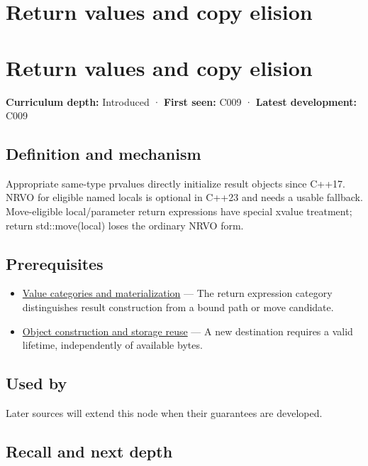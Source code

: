 \hypertarget{appendix-b08d3788c5c6}{}
\section*{Return values and copy elision}
\section{Return values and copy elision}\label{appendix-b08d3788c5c6-return-values-and-copy-elision}

\textbf{Curriculum depth:} Introduced · \textbf{First seen:} C009 · \textbf{Latest development:} C009

\subsection{Definition and mechanism}\label{appendix-b08d3788c5c6-definition-and-mechanism}

Appropriate same-type prvalues directly initialize result objects since C++17. NRVO for eligible named locals is optional in C++23 and needs a usable fallback. Move-eligible local/parameter return expressions have special xvalue treatment; return std::move(local) loses the ordinary NRVO form.

\subsection{Prerequisites}\label{appendix-b08d3788c5c6-prerequisites}

\begin{itemize}
\tightlist
\item
  \hyperref[appendix-1121b30eaeb0]{Value categories and materialization} --- The return expression category distinguishes result construction from a bound path or move candidate.
\item
  \hyperref[appendix-a82f9c438857]{Object construction and storage reuse} --- A new destination requires a valid lifetime, independently of available bytes.
\end{itemize}

\subsection{Used by}\label{appendix-b08d3788c5c6-used-by}

Later sources will extend this node when their guarantees are developed.

\subsection{Recall and next depth}\label{appendix-b08d3788c5c6-recall-and-next-depth}

